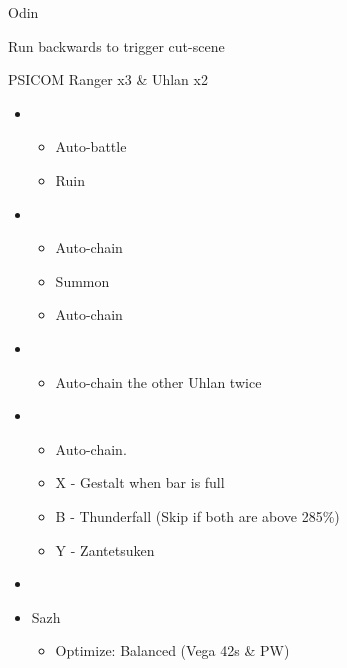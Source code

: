 \begin{multicols}{2}
\begin{battle}{Odin}
\end{battle}
Run backwards to trigger cut-scene
\vfill
\begin{battle}{PSICOM Ranger x3 \& Uhlan x2}
\begin{itemize}
    \item \second
    \begin{itemize}
        \item Auto-battle
        \item Ruin
    \end{itemize}
    \item \fourth
    \begin{itemize}
        \item Auto-chain
        \item Summon
        \item Auto-chain
    \end{itemize}
    \item \fifth
    \begin{itemize}
        \item Auto-chain the other Uhlan twice
    \end{itemize}
    \item \fourth
    \begin{itemize}
        \item Auto-chain.
		\item X - Gestalt when bar is full
		\item B - Thunderfall (Skip if both are above 285\%)
		\item Y - Zantetsuken
    \end{itemize}
\end{itemize}
 
\end{battle}



\begin{menu}
\begin{itemize}
    \paradigm
    \begin{itemize}
        \item {}%
{\paradigmline{\com}{\rav}{}}%
{\paradigmline[2]{\textit{\syn}}{\textit{\sab}}{}}%
{\paradigmline{\com}{(\sab)}{}}%
{\paradigmline{\rav}{\rav}{}}
    \end{itemize}
    \equip
    \begin{itemize}
        \item Sazh
        \begin{itemize}
            \item Optimize: Balanced (Vega 42s \& PW)
        \end{itemize}
    \end{itemize}
\end{itemize}
\end{menu}


\end{multicols}
